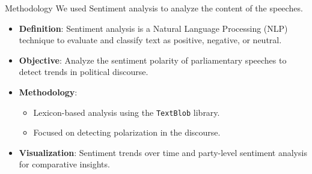 \documentclass[8pt]{beamer}
\begin{document}
\begin{frame}{Methodology}
    We used Sentiment analysis to analyze the content of the speeches.
    \begin{itemize}
        \item \textbf{Definition}: Sentiment analysis is a Natural Language Processing (NLP) technique to evaluate and classify text as positive, negative, or neutral.
        \item \textbf{Objective}: Analyze the sentiment polarity of parliamentary speeches to detect trends in political discourse.
        \item \textbf{Methodology}:
        \begin{itemize}
            \item Lexicon-based analysis using the \texttt{TextBlob} library.
            \item Focused on detecting polarization in the discourse.
        \end{itemize}
        \item \textbf{Visualization}: Sentiment trends over time and party-level sentiment analysis for comparative insights.
    \end{itemize}


\end{frame}
\end{document}
